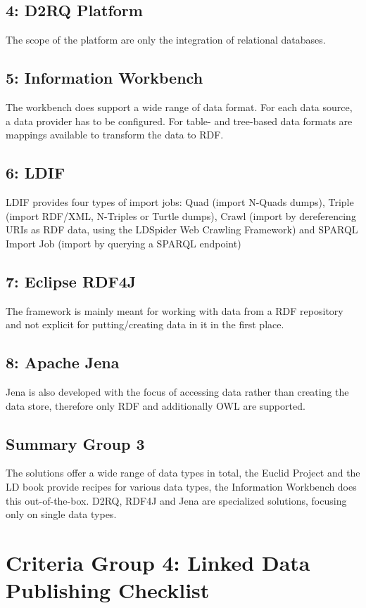 \subsection*{4: D2RQ Platform}
The scope of the platform are only the integration of relational databases.

\subsection*{5: Information Workbench}
The workbench does support a wide range of data format. For each data source, a data provider has to be configured. For table- and tree-based data formats are mappings available to transform the data to RDF.

\subsection*{6: LDIF}
LDIF provides four types of import jobs: Quad (import N-Quads dumps), Triple (import RDF/XML, N-Triples or Turtle dumps), Crawl (import by dereferencing URIs as RDF data, using the LDSpider Web Crawling Framework) and SPARQL Import Job (import by querying a SPARQL endpoint)

\subsection*{7: Eclipse RDF4J}
The framework is mainly meant for working with data from a RDF repository and not explicit for putting/creating data in it in the first place. 

\subsection*{8: Apache Jena}
Jena is also developed with the focus of accessing data rather than creating the data store, therefore only RDF and additionally OWL are supported.

\subsection{Summary Group 3}
The solutions offer a wide range of data types in total, the Euclid Project and the LD book provide recipes for various data types, the Information Workbench does this out-of-the-box. D2RQ, RDF4J and Jena are specialized solutions, focusing only on single data types.

\section{Criteria Group 4: Linked Data Publishing Checklist}


